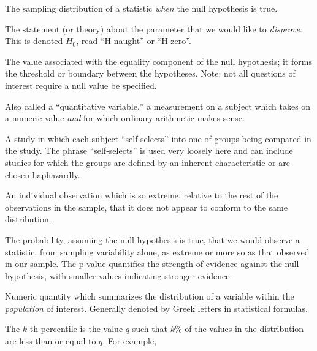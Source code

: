 \documentclass[
  letterpaper,
  DIV=11,
  numbers=noendperiod]{scrreprt}
\providecommand{\tightlist}{%
  \setlength{\itemsep}{0pt}\setlength{\parskip}{0pt}}\usepackage{longtable,booktabs,array}
\theoremstyle{plain}
\theoremstyle{definition}
\theoremstyle{definition}
\theoremstyle{remark}
\begin{document}
\begin{description}
\tightlist
\item[Null Distribution (Definition~\ref{def-null-distribution})]
The sampling distribution of a statistic \emph{when} the null hypothesis
is true.
\item[Null Hypothesis (Definition~\ref{def-null-hypothesis})]
The statement (or theory) about the parameter that we would like to
\emph{disprove}. This is denoted \(H_0\), read ``H-naught'' or
``H-zero''.
\item[Null Value (Definition~\ref{def-null-value})]
The value associated with the equality component of the null hypothesis;
it forms the threshold or boundary between the hypotheses. Note: not all
questions of interest require a null value be specified.
\item[Numeric Variable (Definition~\ref{def-numeric})]
Also called a ``quantitative variable,'' a measurement on a subject
which takes on a numeric value \emph{and} for which ordinary arithmetic
makes sense.
\item[Observational Study (Definition~\ref{def-observational-study})]
A study in which each subject ``self-selects'' into one of groups being
compared in the study. The phrase ``self-selects'' is used very loosely
here and can include studies for which the groups are defined by an
inherent characteristic or are chosen haphazardly.
\item[Outlier (Definition~\ref{def-outlier})]
An individual observation which is so extreme, relative to the rest of
the observations in the sample, that it does not appear to conform to
the same distribution.
\item[P-Value (Definition~\ref{def-pvalue})]
The probability, assuming the null hypothesis is true, that we would
observe a statistic, from sampling variability alone, as extreme or more
so as that observed in our sample. The p-value quantifies the strength
of evidence against the null hypothesis, with smaller values indicating
stronger evidence.
\item[Parameter (Definition~\ref{def-parameter})]
Numeric quantity which summarizes the distribution of a variable within
the \emph{population} of interest. Generally denoted by Greek letters in
statistical formulas.
\item[Percentile (Definition~\ref{def-percentile})]
The \(k\)-th percentile is the value \(q\) such that \(k\)\% of the
values in the distribution are less than or equal to \(q\). For example,
\end{description}
\end{document}
